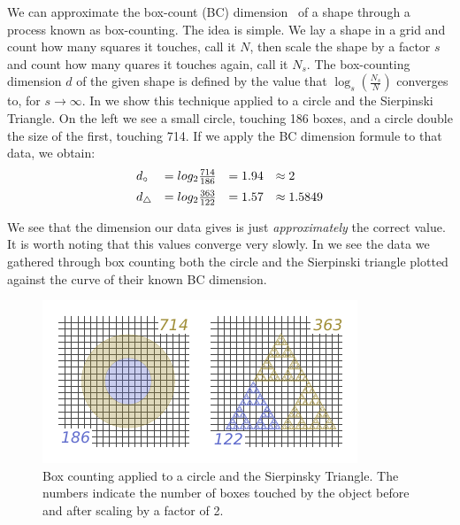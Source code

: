 
  We can approximate the box-count (BC) dimension~\cite{findref} of a
shape through a process known as box-counting. The idea is simple. We
lay a shape in a grid and count how many squares it touches, call it
$N$, then scale the shape by a factor $s$ and count how many quares it
touches again, call it $N_s$. The box-counting dimension $d$ of the
given shape is defined by the value that $\log_s(\frac{N_s}{N})$
converges to, for $s \rightarrow \infty$.  In  we show this
technique applied to a circle and the Sierpinski Triangle. On the left
we see a small circle, touching 186 boxes, and a circle double the size of the first, touching 714.
If we apply the BC dimension formule to that data, we obtain:
\[
\begin{array}{l l l l}
  d_{\circ}    &= log_2{\frac{714}{186}} &= 1.94 &\approx 2 \\[.5em]
  d_{\tiny \triangle} &= log_2{\frac{363}{122}} &= 1.57 &\approx 1.5849 \\
\end{array}
\]

  We see that the dimension our data gives is just
\emph{approximately} the correct value. It is worth noting that this
values converge very slowly.   In  we see the data we
gathered through box counting both the circle and the Sierpinski
triangle plotted against the curve of their known BC dimension.

\begin{figure}
  \includegraphics[width=\linewidth]{src/img/box-counting-example-alt.pdf}
  \caption{Box counting applied to a circle and the Sierpinsky Triangle. The numbers
indicate the number of boxes touched by the object before and after scaling by a factor of 2.}
  \label{fig:egboxcount}
\end{figure}

